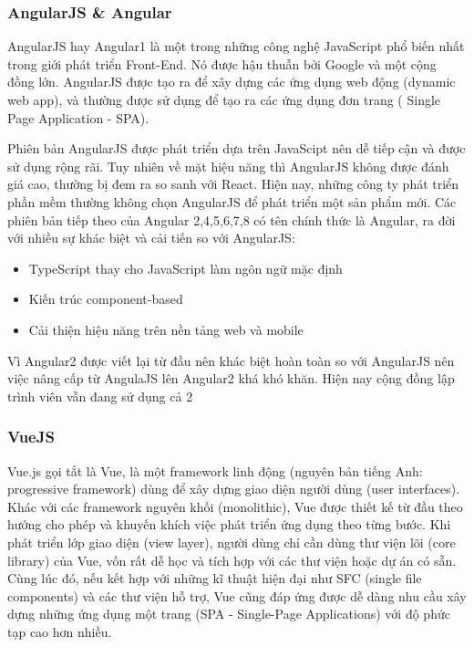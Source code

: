 \subsubsection{AngularJS \& Angular}
AngularJS hay Angular1 là một trong những công nghệ JavaScript phổ biến nhất trong giới phát triển Front-End. Nó được hậu thuẫn bởi Google và một cộng đồng lớn. AngularJS được tạo ra để xây dựng các ứng dụng web động (dynamic web app), và thường được sử dụng để tạo ra các ứng dụng đơn trang ( Single Page Application - SPA).

Phiên bản AngularJS được phát triển dựa trên JavaScipt nên dễ tiếp cận và được sử dụng rộng rãi. Tuy nhiên về mặt hiệu năng thì AngularJS không được đánh giá cao, thường bị đem ra so sanh với React. Hiện nay, những công ty phát triển phần mềm thường không chọn AngularJS để phát triển một sản phẩm mới.
Các phiên bản tiếp theo của Angular 2,4,5,6,7,8 có tên chính thức là Angular, ra đời với nhiều sự khác biệt và cải tiến so với AngularJS:
\begin {itemize}
\item TypeScript thay cho JavaScript làm ngôn ngữ mặc định
\item Kiến trúc component-based
\item Cải thiện hiệu năng trên nền tảng web và mobile
\end {itemize}
Vì Angular2 được viết lại từ đầu nên khác biệt hoàn toàn so với AngularJS nên việc nâng cấp từ AngulaJS lên Angular2 khá khó khăn. Hiện nay cộng đồng lập trình viên vẫn đang sử dụng cả 2 

\subsubsection{VueJS}
Vue.js gọi tắt là Vue, là một framework linh động (nguyên bản tiếng Anh: progressive framework) dùng để xây dựng giao diện người dùng (user interfaces). Khác với các framework nguyên khối (monolithic), Vue được thiết kế từ đầu theo hướng cho phép và khuyến khích việc phát triển ứng dụng theo từng bước. Khi phát triển lớp giao diện (view layer), người dùng chỉ cần dùng thư viện lõi (core library) của Vue, vốn rất dễ học và tích hợp với các thư viện hoặc dự án có sẵn. Cùng lúc đó, nếu kết hợp với những kĩ thuật hiện đại như SFC (single file components) và các thư viện hỗ trợ, Vue cũng đáp ứng được dễ dàng nhu cầu xây dựng những ứng dụng một trang (SPA - Single-Page Applications) với độ phức tạp cao hơn nhiều.


